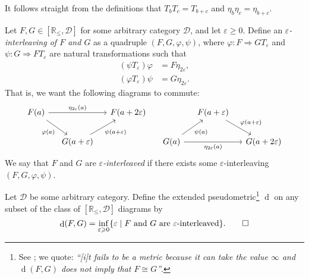 \documentclass[12pt]{article}
\numberwithin{equation}{subsection}
\numberwithin{theorem}{subsection}
\numberwithin{lemma}{subsection}
\numberwithin{corollary}{subsection}
\numberwithin{definition}{subsection}
\numberwithin{example}{subsection}
\numberwithin{note}{subsection}
\newcommand{\rr}{\mathbb{R}}
\newcommand{\rrleq}{\rr_\leqslant}
\newcommand{\dcat}{\mathcal{D}}
\DeclareMathOperator{\dist}{d}
\newcommand{\nt}{\Rightarrow}
\newcommand{\vare}{\varepsilon}
\begin{document}
        It follows straight from the definitions that $T_bT_c=T_{b+c}$ and $\eta_b\eta_c=\eta_{b+c}$.

        \begin{definition}
            Let $F,G\in[\rrleq,\dcat]$ for some arbitrary category $\dcat$, and let $\vare\geqslant0$.
            Define an \emph{$\vare$-interleaving of $F$ and $G$} as a quadruple $(F,G,\varphi,\psi)$, where $\varphi\colon F\nt GT_\vare$ and $\psi\colon G\nt FT_\vare$ are natural transformations such that
            \begin{align*}
                (\psi T_\vare)\varphi &= F\eta_{2\vare},\\
                (\varphi T_\vare)\psi &= G\eta_{2\vare}.
            \end{align*}
            That is, we want the following diagrams to commute:
            \begin{equation*}
                \begin{tikzcd}[column sep=small]
                    F(a)\arrow{rr}{\eta_{2\vare}(a)}\arrow{dr}[swap]{\varphi(a)} & & F(a+2\vare) & & F(a+\vare)\arrow{dr}{\varphi(a+\vare)} &\\
                    & G(a+\vare)\arrow{ur}[swap]{\psi(a+\vare)} & & G(a)\arrow{rr}[swap]{\eta_{2\vare}(a)}\arrow{ur}[swap]{\psi(a)} & & G(a+2\vare)
                \end{tikzcd}
            \end{equation*}
            We say that $F$ and $G$ are \emph{$\vare$-interleaved} if there exists some $\vare$-interleaving $(F,G,\varphi,\psi)$.
        \end{definition}

        \begin{definition}\label{df:interleaving-metric}
            Let $\dcat$ be some arbitrary category.
            Define the extended pseudometric\footnote{
                See \cite[Theorem~3.3]{Bubenik:dn}; we quote: \emph{``[i]t fails to be a metric because it can take the value $\infty$ and $\dist(F,G)$ does not imply that $F\cong G$''}.
            } $\dist$ on any subset of the class of $[\rrleq,\dcat]$ diagrams by
                \begin{equation*}
                    \dist(F,G)=\inf_{\vare\geqslant0}\{\vare \mid F\text{ and }G\text{ are }\vare\text{-interleaved} \}.\qedhere
                \end{equation*}
        \end{definition}
\end{document}
